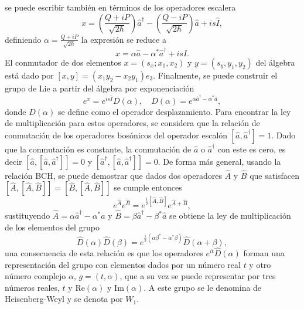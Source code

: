 se puede escribir también en términos de los operadores escalera
\begin{equation}
  x = \left( \frac{Q+iP}{\sqrt{2\hbar}} \right)\hat{a}^{\dagger} - \left( \frac{Q-iP}{\sqrt{2\hbar}} \right)\hat{a} + is\hat{I},
\end{equation}
definiendo $\alpha =  \frac{Q+iP}{\sqrt{2\hbar}}$ la expresión se reduce a
\begin{equation}
  x = \alpha\hat{a} - \alpha^* \hat{a}^{\dagger} + is\hat{I}.
\end{equation}
El conmutador de dos elementos $x = (s_x; x_1, x_2)$ y $y = (s_y, y_1, y_2)$ del álgebra está dado por $[x,y] = (x_1 y_2 - x_2 y_1)e_3$. Finalmente, se puede construir el grupo de Lie a partir del álgebra por exponenciación
\begin{equation}
  e^{x} = e^{is\hat{I}}D(\alpha), \quad D(\alpha) = e^{\alpha\hat{a}^{\dagger} - \alpha^* \hat{a}},
\end{equation}
donde $D(\alpha)$ se define como el operador desplazamiento. Para encontrar la ley de multiplicación para estos operadores, se considera que la relación de conmutación de los operadores bosónicos del operador escalón $[\hat{a}, \hat{a}^{\dagger}]=1$. Dado que la conmutación es constante, la conmutación de $\hat{a}$ o $\hat{a}^{\dagger}$ con este es cero, es decir $[\hat{a}, [\hat{a}, \hat{a}^{\dagger}]] = 0$ y $[\hat{a}^{\dagger}, [\hat{a}, \hat{a}^{\dagger}]] = 0$. De forma más general, usando la relación BCH, se puede demostrar que dados dos operadores $\hat{A}$ y $\hat{B}$ que satisfacen $[\hat{A}, [\hat{A}, \hat{B}]] = [\hat{B}, [\hat{A}, \hat{B}]]$ se cumple entonces
\begin{equation}
  e^{\hat{A}} e^{\hat{B}} = e^{\frac{1}{2}[\hat{A}, \hat{B}]}e^{\hat{A}+\hat{B}},
\end{equation}
sustituyendo $\hat{A} = \alpha \hat{a}^{\dagger} - \alpha^* \hat{a}$ y $\hat{B} = \beta\hat{a}^{\dagger} - \beta^*\hat{a}$ se obtiene la ley de multiplicación de los elementos del grupo
\begin{equation}
  \hat{D}(\alpha)\hat{D}(\beta) = e^{\frac{1}{2}(\alpha\beta^* - \alpha^*\beta)}\hat{D}(\alpha+\beta),
\end{equation}
una consecuencia de esta relación es que los operadores $e^{it}\hat{D}(\alpha)$ forman una representación del grupo con elementos dados por un número real $t$ y otro número complejo $\alpha$, $g = (t, \alpha)$, que a su vez se puede representar por tres números reales, $t$ y $\mathrm{Re}(\alpha)$ y $\mathrm{Im}(\alpha)$. A este grupo se le denomina de Heisenberg-Weyl y se denota por $W_1$.

